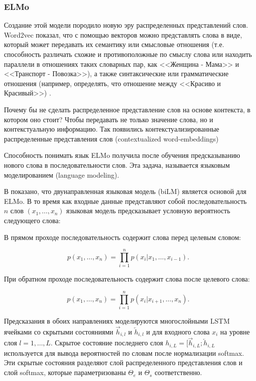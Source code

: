 
\subsubsection{ELMo}

Создание этой модели породило новую эру распределенных представлений слов. Word2vec показал, что с помощью
векторов можно представлять слова в виде, который может передавать их семантику или смысловые отношения (т.е.
способность различать схожие и противоположные по смыслу слова или находить параллели в отношениях таких
словарных пар, как <<Женщина - Мама>> и <<Транспорт - Повозка>>), а также синтаксические или грамматические
отношения (например, определять, что отношение между <<Красиво и Красивый>>) \cite{elmoru}.

\bigskip
Почему бы не сделать распределенное представление слов на основе контекста, в котором оно стоит? Чтобы
передавать не только значение слова, но и контекстуальную информацию. Так появились контекстуализированные
распределенные представления слов (contextualized word-embeddings)

\bigskip
Способность понимать язык ELMo получила после обучения предсказыванию нового слова в последовательности слов.
Эта задача, называется языковым моделированием (language modeling).

\bigskip
В \cite{elmoen} показано, что двунаправленная языковая модель (biLM) является основой для ELMo. В то время как
входные данные представляют собой последовательность $n$ слов $(x_1, \ldots, x_n)$ языковая модель
предсказывает условную вероятность следующего слова:

\bigskip
В прямом проходе последовательность содержит слова перед целевым словом:

\begin{equation*}
  p(x_1, \ldots, x_n) = \prod_{i=1}^n p(x_i| x_1, \ldots, x_{i-1}).
\end{equation*}

\bigskip
При обратном проходе последовательность содержит слова после целевого слова:

\begin{equation*}
  p(x_1, \ldots, x_n) = \prod_{i=1}^n p(x_i| x_{i+1}, \ldots, x_n).
 \end{equation*}

\bigskip
Предсказания в обоих направлениях моделируются многослойными LSTM ячейками со скрытыми состояниями
$\overrightarrow{h}_{i,l}$ и $\overleftarrow{h}_{i,l}$ и для входного слова $x_i$ на уровне слоя $l = 1,
\ldots, L$. Скрытое состояние последнего слоя $h_{i,L} = [\overrightarrow{h}_{i,L}; \overleftarrow{h}_{i,L}$
используется для вывода вероятностей по словам после нормализации softmax. Эти скрытые состояния разделяют
слой распределенного представления слов и слой softmax, которые параметризованы $\Theta_e$ и $\Theta_s$
соответственно.

